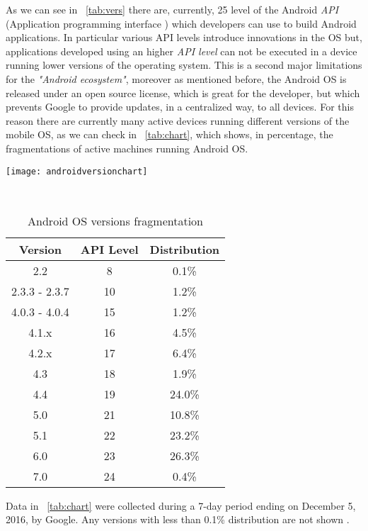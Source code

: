  As we can see in \tablename~\ref{tab:vers} there are, currently, 25 level of the Android \textit{API} (Application programming interface
 ) which developers can use to build Android applications. In particular various API levels introduce innovations in the OS but, applications developed using an higher \textit{API level} can not be executed in a device running lower versions of the operating system. This is a second major limitations for the \textit{"Android ecosystem"}, moreover as mentioned before, the Android OS is released under an open source license, which is great for the developer, but which prevents Google to provide updates, in a centralized way, to all devices. For this reason there are currently many active devices running different versions of the mobile OS, as we can check in \tablename~\ref{tab:chart}, which shows, in percentage, the fragmentations of active machines running Android OS.\\
 \begin{table}[h]
 	\caption{Android OS versions fragmentation}
 	\label{tab:chart}
 	
 	\begin{minipage}{0.5\textwidth}
 		\centering
 		\texttt{[image: androidversionchart]}
 		\label{2.2:Android fragmentation chart}
 		
 	\end{minipage}
 ~\hfill~
 \begin{minipage}{0.5 \textwidth}
 	\centering
 	\begin{tabular}{ccc}
 		\toprule
 		\textbf{Version}  & \textbf{API Level} & \textbf{Distribution}\\
 		\midrule
 		2.2 & 8 & 0.1\% \\
 		2.3.3 - 2.3.7 & 10 & 1.2\% \\
 		4.0.3 - 4.0.4 & 15 & 1.2\% \\
 		4.1.x & 16 & 4.5\% \\
 		4.2.x & 17 & 6.4\% \\
 		4.3 & 18 & 1.9\% \\
 		4.4 & 19 & 24.0\% \\
 		5.0 & 21 & 10.8\% \\
 		5.1 & 22 & 23.2\% \\
 		6.0 & 23 & 26.3\% \\
 		7.0 & 24 & 0.4\% \\
 		\bottomrule
 	\end{tabular}
\end{minipage}
 \end{table}
Data in \tablename~\ref{tab:chart} were collected during a 7-day period ending on December 5, 2016, by Google. Any versions with less than 0.1\% distribution are not shown \cite{devandroiddash}.
